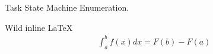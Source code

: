 \documentclass[letterpaper,10pt,english]{sphinxmanual}
\begin{document}
\begin{fulllineitems}
\label{\detokenize{source_code:_CPPv417jocktos_TaskState}}\label{\detokenize{source_code:_CPPv317jocktos_TaskState}}\label{\detokenize{source_code:_CPPv217jocktos_TaskState}}
\pysigstartsignatures
\pysigstartmultiline
{}
\pysigstopmultiline
\pysigstopsignatures
\sphinxAtStartPar
Task State Machine Enumeration. 

\sphinxAtStartPar
\begin{description}
\sphinxAtStartPar
Wild inline LaTeX \begin{equation*}
\begin{split}
\int_a^b f(x) dx = F(b) - F(a)
\end{split}
\end{equation*}

\end{description}



\end{fulllineitems}
\end{document}
